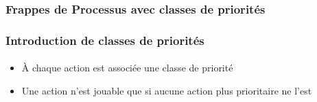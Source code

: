 
\begin{frame}[c]
  \frametitle{Frappes de Processus avec classes de priorités}


\end{frame}



\begin{frame}[t]
  \frametitle{Introduction de classes de priorités}
  \framesubtitle{\tcite{\cfpmrcsbio}}

\bigskip
\begin{itemize}
  \item À chaque action est associée une classe de priorité
  \item Une action n'est jouable que si aucune action plus prioritaire ne l'est
\end{itemize}

\medskip

\begin{center}


\end{center}
\end{frame}
